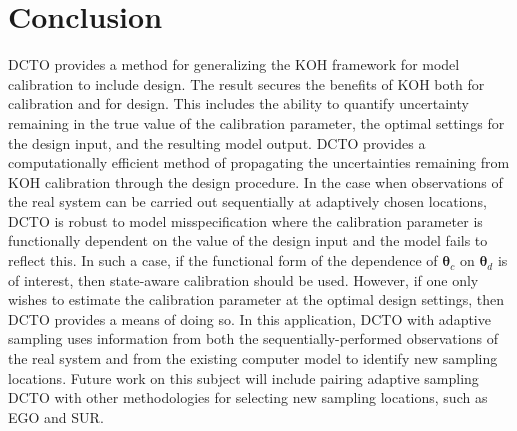 \documentclass[12pt]{article}
\begin{document}
\section{Conclusion}\label{sec:conclusion}
%
DCTO provides a method for generalizing the KOH framework for model calibration to include design.
%
The result secures the benefits of KOH both for calibration and for design.
%
This includes the ability to quantify uncertainty remaining in the true value of the calibration parameter, the optimal settings for the design input, and the resulting model output.
%
DCTO provides a computationally efficient method of propagating the uncertainties remaining from KOH calibration through the design procedure.
%
In the case when observations of the real system can be carried out sequentially at adaptively chosen locations, DCTO is robust to model misspecification where the calibration parameter is functionally dependent on the value of the design input and the model fails to reflect this.
%
In such a case, if the functional form of the dependence of $\boldsymbol\theta_c$ on $\boldsymbol\theta_d$ is of interest, then state-aware calibration should be used.
%
However, if one only wishes to estimate the calibration parameter at the optimal design settings, then DCTO provides a means of doing so.
%
In this application, DCTO with adaptive sampling uses information from both the sequentially-performed observations of the real system and from the existing computer model to identify new sampling locations.
%
Future work on this subject will include pairing adaptive sampling DCTO with other methodologies for selecting new sampling locations, such as EGO and SUR.
%

\bigskip

%
%
%
%




\end{document}
